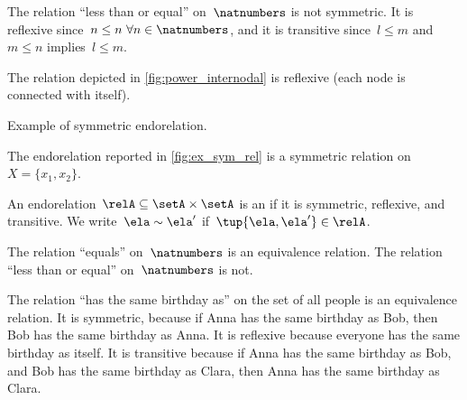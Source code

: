 \begin{example}
  The relation ``less than or equal'' on~$\natnumbers$ is not symmetric. It is reflexive since~$n\leq n \ \forall n\in \natnumbers$, and it is transitive since~$l\leq m$ and~$m\leq n$ implies~$l\leq m$.
\end{example}

\begin{example}
  The relation depicted in \cref{fig:power_internodal} is reflexive (each node is connected with itself).
\end{example}
\begin{marginfigure}
    \begin{center}
    \end{center}
    \caption{Example of symmetric endorelation.}
    \label{fig:ex_sym_rel}
  \end{marginfigure}
\begin{example}
  The endorelation reported in \cref{fig:ex_sym_rel} is a symmetric relation on~$X=\{x_1,x_2\}$.
\end{example}

\devel{ }%

\begin{definition}
  \label{def:equivalence-relation}
  An endorelation~$\relA\subseteq \setA\times \setA$ is an \emph{} if it is symmetric, reflexive, and transitive. We write~$\ela\sim \ela'$ if~$\tup{\ela,\ela'}\in \relA$.
\end{definition}

\begin{example}
  The relation ``equals'' on~$\natnumbers$ is an equivalence relation.
  The relation ``less than or equal'' on~$\natnumbers$ is not.
\end{example}

\begin{example}
  The relation ``has the same birthday as'' on the set of all people is an equivalence relation.
  It is symmetric, because if Anna has the same birthday as Bob, then Bob has the same birthday as Anna.
  It is reflexive because everyone has the same birthday as itself.
  It is transitive because if Anna has the same birthday as Bob, and Bob has the same birthday as Clara, then Anna has the same birthday as Clara.
\end{example}

